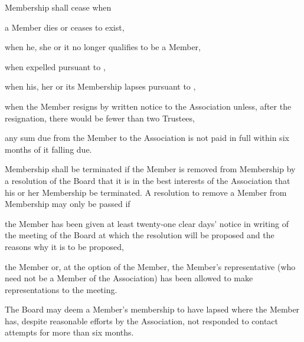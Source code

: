\documentclass[10pt]{mk-articles-of-association}
\newcommand{\EC}[0]{Board}
\newcommand{\Exec}[0]{\EC{} }
\begin{document}
\begin{constenum}

  \item
    Membership shall cease when
    \begin{constenum}
      \item a Member dies or ceases to exist,
      \item when he, she or it no longer qualifies to be a Member,
      \item when expelled pursuant to ,
      \item when his, her or its Membership lapses pursuant to
        ,
      \item when the Member resigns by written notice to the
        Association unless, after the resignation, there would be
        fewer than two Trustees, \ITor{}
      \item any sum due from the Member to the Association is not paid in full
        within six months of it falling due.
    \end{constenum}

\item Membership shall be terminated if
\label{expulsion}
  the Member is removed from Membership by a resolution of the
  \Exec that it is in the best interests of the Association that his or
  her Membership be terminated. A resolution to remove a Member from
  Membership may only be passed if

\begin{constenum}

\item the Member has been given at least twenty-one clear days' notice in
  writing of the meeting of the \Exec at which the resolution will
  be proposed and the reasons why it is to be proposed,

\item the Member or, at the option of the Member, the Member's
  representative (who need not be a Member of the Association) has been
  allowed to make representations to the meeting.

\end{constenum}

\item The \Exec may deem a Member's membership to have lapsed where
  the Member has, despite reasonable efforts by the Association, not
  responded to contact attempts for more than six months.
  \label{lapse}

\end{constenum}

\end{document}
